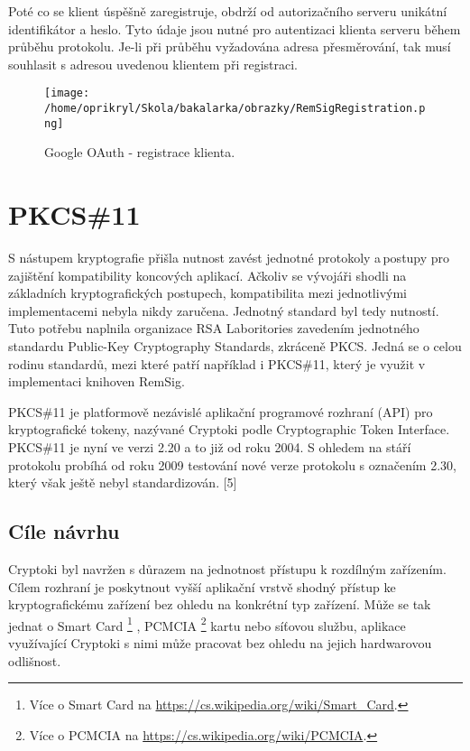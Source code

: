 \documentclass[]{fithesis3}
\begin{document}
	Poté co se klient úspěšně zaregistruje, obdrží od autorizačního serveru unikátní identifikátor a 		heslo. Tyto údaje jsou nutné pro autentizaci klienta serveru během průběhu protokolu. Je-li při 		průběhu vyžadována adresa přesměrování, tak musí souhlasit s adresou uvedenou klientem při 	registraci.

	\begin{figure}[!ht]
  		\begin{minipage}{1.00\textwidth}
    			\texttt{[image: /home/oprikryl/Skola/bakalarka/obrazky/RemSigRegistration.png]}
  		\end{minipage}
 		\caption{Google OAuth - registrace klienta.}
  		\label{fig:Google OAuth - registrace klienta.}
	\end{figure}	
	\newpage

\chapter{PKCS\#11}

S nástupem kryptografie přišla nutnost zavést jednotné protokoly a\,postupy pro zajištění kompatibility koncových aplikací. Ačkoliv se vývojáři shodli na základních kryptografických postupech, kompatibilita mezi jednotlivými implementacemi nebyla nikdy zaručena. Jednotný standard byl tedy nutností. Tuto potřebu naplnila organizace RSA Laboritories zavedením jednotného standardu Public-Key Cryptography Standards, zkráceně PKCS. Jedná se o celou rodinu standardů, mezi které patří například i PKCS\#11, který je využit v\,implementaci knihoven RemSig.

PKCS\#11 je platformově nezávislé aplikační programové rozhraní (API) pro kryptografické tokeny, nazývané Cryptoki podle Cryptographic Token Interface. PKCS\#11 je nyní ve verzi 2.20 a to již od roku 2004. S ohledem na stáří protokolu probíhá od roku 2009 testování nové verze protokolu s označením 2.30, který však ještě nebyl standardizován. [5]

	\section{Cíle návrhu}

	Cryptoki byl navržen s důrazem na jednotnost přístupu k rozdílným zařízením. Cílem rozhraní je 		poskytnout vyšší aplikační vrstvě shodný přístup ke kryptografickému zařízení bez ohledu na 		konkrétní typ zařízení. Může se tak jednat o 
	Smart Card \footnote{Více o Smart Card na \url{https://cs.wikipedia.org/wiki/Smart_Card}.} 
	, 
	PCMCIA \footnote{Více o PCMCIA na \url{https://cs.wikipedia.org/wiki/PCMCIA}.} 
	kartu nebo síťovou službu, aplikace využívající Cryptoki s nimi může pracovat bez ohledu na 		jejich hardwarovou odlišnost.
\end{document}
